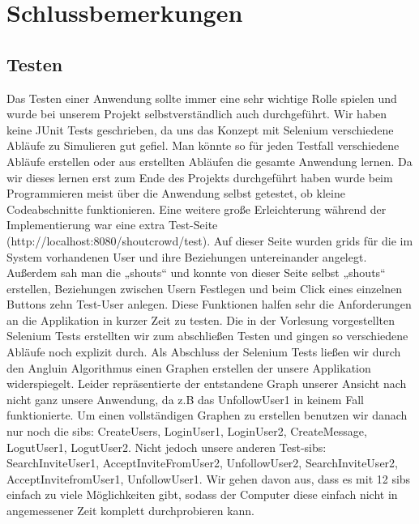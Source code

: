 \section{Schlussbemerkungen}

\subsection{Testen}
Das Testen einer Anwendung sollte immer eine sehr wichtige Rolle spielen und wurde bei unserem Projekt selbstverständlich auch durchgeführt. Wir haben keine JUnit Tests geschrieben, da uns das Konzept mit Selenium verschiedene Abläufe zu Simulieren gut gefiel. Man könnte so für jeden Testfall verschiedene Abläufe erstellen oder aus erstellten Abläufen die gesamte Anwendung lernen.  
Da wir dieses lernen erst zum Ende des Projekts durchgeführt haben wurde beim Programmieren meist über die Anwendung selbst getestet, ob kleine Codeabschnitte funktionieren. Eine weitere große Erleichterung während der Implementierung war eine extra Test-Seite (http://localhost:8080/shoutcrowd/test). Auf dieser Seite wurden grids für die im System vorhandenen User und ihre Beziehungen untereinander angelegt. Außerdem sah man die „shouts“ und konnte von dieser Seite selbst „shouts“ erstellen, Beziehungen zwischen Usern Festlegen und beim Click eines einzelnen Buttons zehn Test-User anlegen. Diese Funktionen halfen sehr die Anforderungen an die Applikation in kurzer Zeit zu testen. 
Die in der Vorlesung vorgestellten Selenium Tests erstellten wir zum abschließen Testen und gingen so verschiedene Abläufe noch explizit durch. Als Abschluss der Selenium Tests ließen wir durch den Angluin Algorithmus einen Graphen erstellen der unsere Applikation widerspiegelt.  
Leider repräsentierte der entstandene Graph unserer Ansicht nach nicht ganz unsere Anwendung, da z.B das UnfollowUser1 in keinem Fall funktionierte. Um einen vollständigen Graphen zu erstellen benutzen wir danach nur noch die sibs: CreateUsers, LoginUser1, LoginUser2, CreateMessage, LogutUser1, LogutUser2. Nicht jedoch unsere anderen Test-sibs: SearchInviteUser1, AcceptInviteFromUser2, UnfollowUser2, SearchInviteUser2, AcceptInvitefromUser1, UnfollowUser1. Wir gehen davon aus, dass es mit 12 sibs einfach zu viele Möglichkeiten gibt, sodass der Computer diese einfach nicht in angemessener Zeit komplett durchprobieren kann. 


